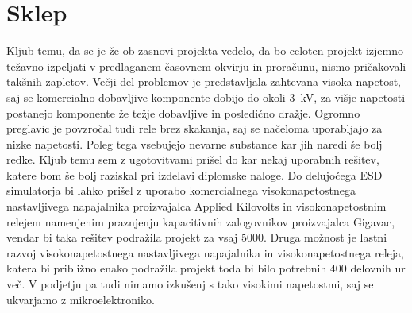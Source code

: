 \documentclass[a4paper,twoside,openright,12pt,Slovene]{book}
\begin{document}
\chapter{Sklep} \label{Sklep}

	Kljub temu, da se je že ob zasnovi projekta vedelo, da bo celoten projekt izjemno težavno izpeljati v predlaganem časovnem okvirju in proračunu, nismo pričakovali takšnih zapletov. Večji del problemov je predstavljala zahtevana visoka napetost, saj se komercialno dobavljive komponente dobijo do okoli \SI{3}{\kilo\volt}, za višje napetosti postanejo komponente že težje dobavljive in posledično dražje. Ogromno preglavic je povzročal tudi rele brez skakanja, saj se načeloma uporabljajo za nizke napetosti. Poleg tega vsebujejo nevarne substance kar jih naredi še bolj redke. Kljub temu sem z ugotovitvami prišel do kar nekaj uporabnih rešitev, katere bom še bolj raziskal pri izdelavi diplomske naloge. Do delujočega ESD simulatorja bi lahko prišel z uporabo komercialnega visokonapetostnega nastavljivega napajalnika proizvajalca Applied Kilovolts in visokonapetostnim relejem namenjenim praznjenju kapacitivnih zalogovnikov proizvajalca Gigavac, vendar bi taka rešitev podražila projekt za vsaj 5000\texteuro. Druga možnost je lastni razvoj visokonapetostnega nastavljivega napajalnika in visokonapetostnega releja, katera bi približno enako podražila projekt toda bi bilo potrebnih 400 delovnih ur več. V podjetju pa tudi nimamo izkušenj s tako visokimi napetostmi, saj se ukvarjamo z mikroelektroniko.
	
	
	
	
 
\end{document}
